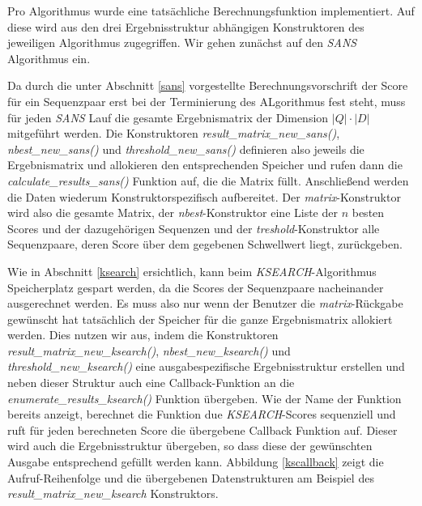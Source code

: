 \documentclass{article}
\begin{document}
Pro Algorithmus wurde eine tatsächliche Berechnungsfunktion implementiert. Auf diese wird aus den drei Ergebnisstruktur abhängigen Konstruktoren des jeweiligen
Algorithmus zugegriffen. Wir gehen zunächst auf den \emph{SANS} Algorithmus ein.

Da durch die unter Abschnitt \ref{sans} vorgestellte Berechnungsvorschrift der Score für ein Sequenzpaar erst bei der Terminierung des ALgorithmus
fest steht, muss für jeden \emph{SANS} Lauf die gesamte Ergebnismatrix der Dimension $|Q|\cdot|D|$ mitgeführt werden. Die Konstruktoren 
\emph{result\_matrix\_new\_sans()}, \emph{nbest\_new\_sans()} und  \emph{threshold\_new\_sans()} definieren also jeweils die Ergebnismatrix und allokieren
den entsprechenden Speicher und rufen dann die \emph{calculate\_results\_sans()} Funktion auf, die die Matrix füllt. Anschließend werden die Daten 
wiederum Konstruktorspezifisch aufbereitet. Der \emph{matrix}-Konstruktor wird also die gesamte Matrix, der \emph{nbest}-Konstruktor eine
Liste der $n$ besten Scores und der dazugehörigen Sequenzen und der \emph{treshold}-Konstruktor alle Sequenzpaare, deren Score über dem gegebenen
Schwellwert liegt, zurückgeben.

Wie in Abschnitt \ref{ksearch} ersichtlich, kann beim \emph{KSEARCH}-Algorithmus Speicherplatz gespart werden, da die Scores der Sequenzpaare
nacheinander ausgerechnet werden. Es muss also nur wenn der Benutzer die \emph{matrix}-Rückgabe gewünscht hat tatsächlich der Speicher für die
ganze Ergebnismatrix allokiert werden. Dies nutzen wir aus, indem die Konstruktoren \emph{result\_matrix\_new\_ksearch()}, \emph{nbest\_new\_ksearch()} 
und  \emph{threshold\_new\_ksearch()} eine ausgabespezifische Ergebnisstruktur erstellen und neben dieser Struktur auch eine Callback-Funktion an 
die \emph{enumerate\_results\_ksearch()} Funktion übergeben. Wie der Name der Funktion bereits anzeigt, berechnet die Funktion due \emph{KSEARCH}-Scores
sequenziell und ruft für jeden berechneten Score die übergebene Callback Funktion auf. Dieser wird auch die Ergebnisstruktur übergeben, so dass diese
der gewünschten Ausgabe entsprechend gefüllt werden kann. Abbildung \ref{kscallback} zeigt die Aufruf-Reihenfolge und die übergebenen Datenstrukturen am
Beispiel des \emph{result\_matrix\_new\_ksearch} Konstruktors.
\end{document}
